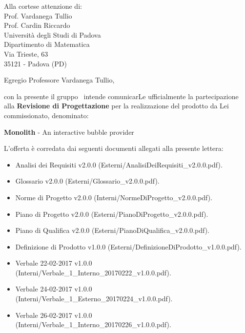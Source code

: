 

\newcommand{\logo}{../../Template/Logo/Logo.png}
\newcommand{\data}{\today}
\newcommand{\oggetto}{Presentazione della proposta di partecipazione alla Revisione di progetto.}
\newcommand{\mittente}{Francesco Bazzerla \\ Responsabile NPE Developers}
\newcommand{\firma}{../../Template/Firme/FB.png}





\begin{letter}{Alla cortese attenzione di:  \\
 Prof. Vardanega Tullio \\
 Prof. Cardin Riccardo \\
 Università degli Studi di Padova \\
 Dipartimento di Matematica \\
 Via Trieste, 63 \\
 35121 - Padova (PD)}

\opening{Egregio Professore Vardanega Tullio,} 

con la presente il gruppo \gruppo\ intende comunicarLe ufficialmente la partecipazione alla \textbf{Revisione di Progettazione} per la realizzazione del prodotto da Lei commissionato, denominato:
\begin{center}
\textbf{Monolith} - An interactive bubble provider
\end{center}
L'offerta è corredata dai seguenti documenti allegati alla presente lettera:
\begin{itemize}
	\item  Analisi dei Requisiti v2.0.0 (Esterni/AnalisiDeiRequisiti\_v2.0.0.pdf).
	\item  Glossario v2.0.0 (Esterni/Glossario\_v2.0.0.pdf).
	\item  Norme di Progetto v2.0.0 (Interni/NormeDiProgetto\_v2.0.0.pdf).
	\item  Piano di Progetto v2.0.0 (Esterni/PianoDiProgetto\_v2.0.0.pdf).
	\item  Piano di Qualifica v2.0.0 (Esterni/PianoDiQualifica\_v2.0.0.pdf).
	\item Definizione di Prodotto v1.0.0 (Esterni/DefinizioneDiProdotto\_v1.0.0.pdf).
	\item  Verbale 22-02-2017 v1.0.0 (Interni/Verbale\_1\_Interno\_20170222\_v1.0.0.pdf).
		\item  Verbale 24-02-2017 v1.0.0 (Interni/Verbale\_1\_Esterno\_20170224\_v1.0.0.pdf).
			\item  Verbale 26-02-2017 v1.0.0 (Interni/Verbale\_1\_Interno\_20170226\_v1.0.0.pdf).
\end{itemize}


\end{letter}
